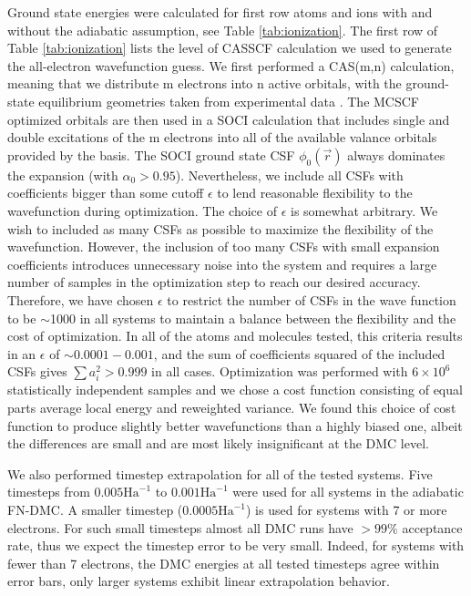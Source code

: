 \documentclass[pra,superscriptaddress,groupedaddress,twocolumn]{revtex4}
\begin{document}
Ground state energies were calculated for first row atoms and ions with and without the adiabatic assumption, see Table \ref{tab:ionization}. The first row of Table \ref{tab:ionization} lists the level of CASSCF calculation we used to generate the all-electron wavefunction guess. We first performed a CAS(m,n) calculation, meaning that we distribute m electrons into n active orbitals, with the ground-state equilibrium geometries taken from experimental data \cite{CCCBDB}. The MCSCF optimized orbitals are then used in a SOCI calculation that includes single and double excitations of the m electrons into all of the available valance orbitals provided by the basis. The SOCI ground state CSF $\phi_0(\vec{r})$ always dominates the expansion (with $\alpha_0>0.95$). Nevertheless, we include all CSFs with coefficients bigger than some cutoff $\epsilon$ to lend reasonable flexibility to the wavefunction during optimization. The choice of $\epsilon$ is somewhat arbitrary. We wish to included as many CSFs as possible to maximize the flexibility of the wavefunction. However, the inclusion of too many CSFs with small expansion coefficients introduces unnecessary noise into the system and requires a large number of samples in the optimization step to reach our desired accuracy. Therefore, we have chosen $\epsilon$ to restrict the number of CSFs in the wave function to be $\sim$1000 in all systems to maintain a balance between the flexibility and the cost of optimization. In all of the atoms and molecules tested, this criteria results in an $\epsilon$ of $\sim 0.0001-0.001$, and the sum of coefficients squared of the included CSFs gives $\sum a_i^2 > 0.999$ in all cases. Optimization was performed with $6\times10^6$ statistically independent samples and we chose a cost function consisting of equal parts average local energy and reweighted variance. We found this choice of cost function to produce slightly better wavefunctions than a highly biased one, albeit the differences are small and are most likely insignificant at the DMC level. 

We also performed timestep extrapolation for all of the tested systems. Five timesteps from $0.005\text{Ha}^{-1}$ to $0.001\text{Ha}^{-1}$ were used for all systems in the adiabatic FN-DMC. A smaller timestep ($0.0005\text{Ha}^{-1}$) is used for systems with 7 or more electrons. For such small timesteps almost all DMC runs have $>99\%$ acceptance rate, thus we expect the timestep error to be very small. Indeed, for systems with fewer than 7 electrons, the DMC energies at all tested timesteps agree within error bars, only larger systems exhibit linear extrapolation behavior.
\end{document}
